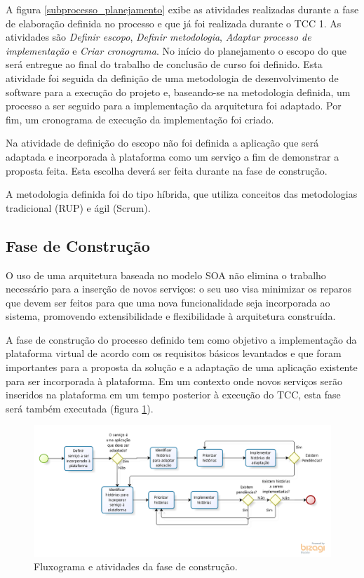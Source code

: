 A figura \ref{subprocesso_planejamento} exibe as atividades realizadas durante a fase de elaboração definida no processo e que já foi realizada durante o TCC 1. As atividades são \textit{Definir escopo}, \textit{Definir metodologia}, \textit{Adaptar processo de implementação} e \textit{Criar cronograma}. No início do planejamento o escopo do que será entregue ao final do trabalho de conclusão de curso foi definido. Esta atividade foi seguida da definição de uma metodologia de desenvolvimento de software para a execução do projeto e, baseando-se na metodologia definida, um processo a ser seguido para a implementação da arquitetura foi adaptado. Por fim, um cronograma de execução da implementação foi criado.

Na atividade de definição do escopo não foi definida a aplicação que será adaptada e incorporada à plataforma como um serviço a fim de demonstrar a proposta feita. Esta escolha deverá ser feita durante na fase de construção.

A metodologia definida foi do tipo híbrida, que utiliza conceitos das metodologias tradicional (RUP) e ágil (Scrum).

\subsection{Fase de Construção}
O uso de uma arquitetura baseada no modelo SOA não elimina o trabalho necessário para a inserção de novos serviços: o seu uso visa minimizar os reparos que devem ser feitos para que uma nova funcionalidade seja incorporada ao sistema, promovendo extensibilidade e flexibilidade à arquitetura construída.

A fase de construção do processo definido tem como objetivo a implementação da plataforma virtual de acordo com os requisitos básicos levantados e que foram importantes para a proposta da solução e a adaptação de uma aplicação existente para ser incorporada à plataforma. Em um contexto onde novos serviços serão inseridos na plataforma em um tempo posterior à execução do TCC, esta fase será também executada (figura \ref{subprocesso_implementacao}).

\begin{figure}[htb]
\centering
\includegraphics[width=1\textwidth]{figuras/subprocesso_implementacao.PNG}
\caption{Fluxograma e atividades da fase de construção.}
\label{subprocesso_implementacao}
\end{figure}

